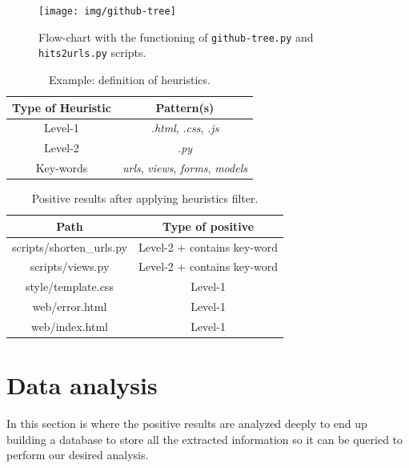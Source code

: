 \documentclass[a4paper, 12pt]{book}
\begin{document}
\begin{figure}
  \centering
  \texttt{[image: img/github-tree]}
  \caption{Flow-chart with the functioning of \texttt{github-tree.py} and \texttt{hits2urls.py} scripts.}
  \label{fig:gh-tree-diagram}
\end{figure}
\begin{table}[]
\centering
\caption{Example: definition of heuristics.}
\label{table:heuristics-table-example}
\begin{tabular}{|c|c|}
\hline
\textbf{Type of Heuristic} & \textbf{Pattern(s)}                                            \\ \hline
Level-1                    & \textit{.html}, \textit{.css}, \textit{.js}                    \\ \hline
Level-2                    & \textit{.py}                                                   \\ \hline
Key-words                  & \textit{urls}, \textit{views}, \textit{forms}, \textit{models} \\ \hline
\end{tabular}
\end{table}
\begin{table}[]
\centering
\caption{Positive results after applying heuristics filter.}
\label{table:heuristics-positive-example}
\begin{tabular}{|c|c|}
\hline
\textbf{Path}              & \textbf{Type of positive}   \\ \hline
scripts/shorten\_urls.py & Level-2 + contains key-word   \\
scripts/views.py           & Level-2 + contains key-word \\
style/template.css         & Level-1                     \\
web/error.html             & Level-1                     \\
web/index.html             & Level-1                     \\ \hline
\end{tabular}
\end{table}
\section{Data analysis}
\label{sec:data-analysis}
In this section is where the positive results are analyzed deeply to end up building a database to store
all the extracted information so it can be queried to perform our desired analysis.
\end{document}
